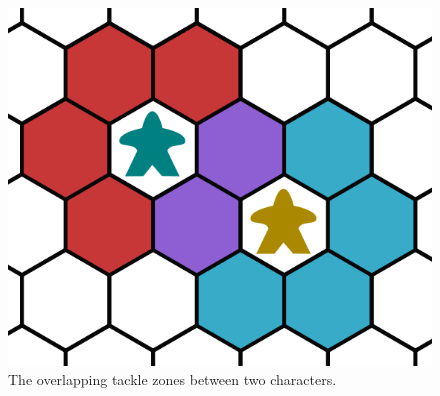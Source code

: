 \begin{figure}
    \centering
    \includegraphics{graphics/tackle-zones-2.png}
    \caption{The overlapping tackle zones between two characters.}
    \label{fig:tackle-zone-2}
\end{figure}